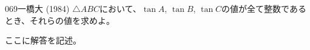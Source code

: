 \begin{thm}{069}{\maru}{一橋大 (1984)}
 $\triangle{ABC}$において、$\tan A$, $\tan B$, $\tan C$の値が全て整数であるとき、それらの値を求めよ。
\end{thm}

ここに解答を記述。